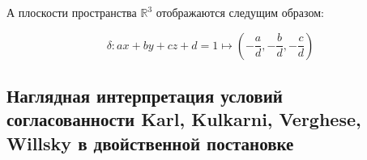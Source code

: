 \documentclass[a4paper, 12pt, titlepage]{article}
\theoremstyle{definition}
\theoremstyle{plain}
\theoremstyle{plain}
\begin{document}
А плоскости пространства $\mathbb{R}^{3}$ отображаются следущим образом:

\begin{equation}
 \delta : a x + b y + c z + d = 1 \longmapsto
 \left(- \frac{a}{d}, - \frac{b}{d}, - \frac{c}{d}\right)
\end{equation}



\subsection{Наглядная интерпретация условий согласованности Karl, Kulkarni, 
Verghese, Willsky в двойственной постановке}

\newpage


\end{document}
